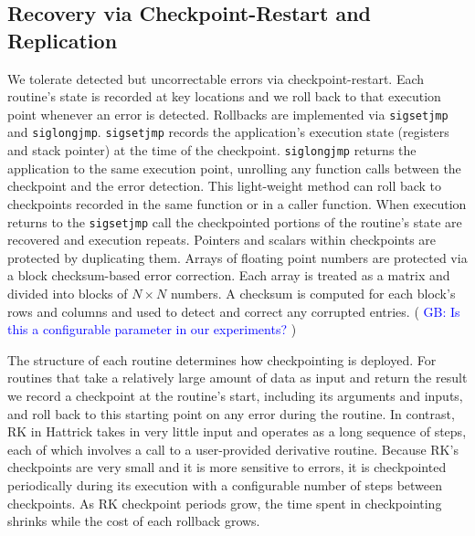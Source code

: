 \documentclass[10pt, conference, compsocconf]{IEEEtran}
\newcommand{\greg}[1]{%
  \textcolor{blue}{GB: #1}
}
\begin{document}
\vspace{-10pt}
\subsection{Recovery via Checkpoint-Restart and \\Replication}
\vspace{-10pt}
\label{sec:res_tech:cr}
We tolerate detected but uncorrectable errors via checkpoint-restart.
Each routine's state is recorded at key locations and we roll back to that execution point whenever an error is detected.
Rollbacks are implemented via \texttt{sigsetjmp} and \texttt{siglongjmp}. %
\texttt{sigsetjmp} records the application's execution state (registers and stack pointer) at the time of the checkpoint.
\texttt{siglongjmp} returns the application to the same execution point, unrolling any function calls between the checkpoint and the error detection.
This light-weight method can roll back to checkpoints recorded in the same function or in a caller function.
When execution returns to the \texttt{sigsetjmp} call the checkpointed portions of the routine's state are recovered and execution repeats.
Pointers and scalars within checkpoints are protected by duplicating them.
Arrays of floating point numbers are protected via a block checksum-based error correction.
Each array is treated as a matrix and divided into blocks of $N \times N$ numbers.
A checksum is computed for each block's rows and columns and used to detect and correct any corrupted entries.
(\greg{Is this a configurable parameter in our experiments?})

The structure of each routine determines how checkpointing is deployed.
For routines that take a relatively large amount of data as input and return the result we record a checkpoint at the routine's start, including its arguments and inputs, and roll back to this starting point on any error during the routine.
In contrast, RK in Hattrick takes in very little input and operates as a long sequence of steps, each of which involves a call to a user-provided derivative routine.
Because RK's checkpoints are very small and it is more sensitive to errors, it is checkpointed periodically during its execution with a configurable number of steps between checkpoints.
As RK checkpoint periods grow, the time spent in checkpointing shrinks while the cost of each rollback grows.
\end{document}
